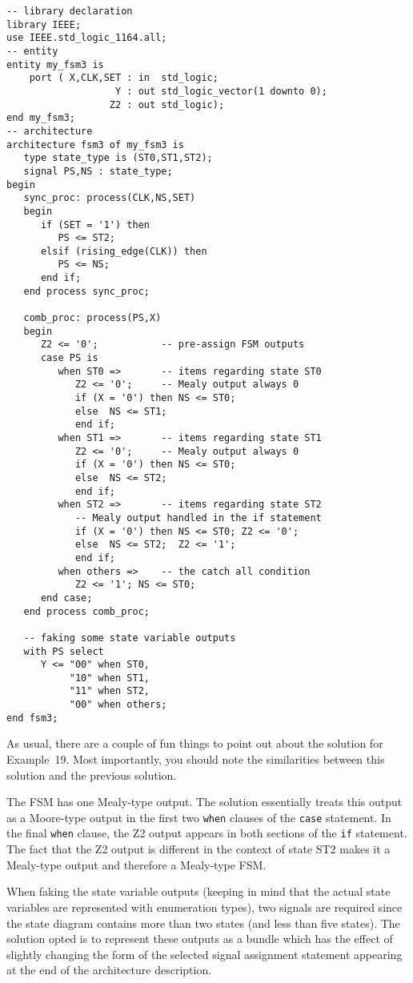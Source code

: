 \noindent
\begin{minipage}{0.99\linewidth}
\begin{lstlisting}[label=exe_19_code, caption=Solution to Example~19.]
-- library declaration
library IEEE;
use IEEE.std_logic_1164.all;
-- entity
entity my_fsm3 is
    port ( X,CLK,SET : in  std_logic;
                   Y : out std_logic_vector(1 downto 0);
                  Z2 : out std_logic);
end my_fsm3;
-- architecture
architecture fsm3 of my_fsm3 is
   type state_type is (ST0,ST1,ST2);
   signal PS,NS : state_type;
begin
   sync_proc: process(CLK,NS,SET)
   begin
      if (SET = '1') then
         PS <= ST2;
      elsif (rising_edge(CLK)) then
         PS <= NS;
      end if;
   end process sync_proc;

   comb_proc: process(PS,X)
   begin
      Z2 <= '0';           -- pre-assign FSM outputs
      case PS is
         when ST0 =>       -- items regarding state ST0
            Z2 <= '0';     -- Mealy output always 0
            if (X = '0') then NS <= ST0;
            else  NS <= ST1;
            end if;
         when ST1 =>       -- items regarding state ST1
            Z2 <= '0';     -- Mealy output always 0
            if (X = '0') then NS <= ST0;
            else  NS <= ST2;
            end if;
         when ST2 =>       -- items regarding state ST2
            -- Mealy output handled in the if statement
            if (X = '0') then NS <= ST0; Z2 <= '0';
            else  NS <= ST2;  Z2 <= '1';
            end if;
         when others =>    -- the catch all condition
            Z2 <= '1'; NS <= ST0;
      end case;
   end process comb_proc;

   -- faking some state variable outputs
   with PS select
      Y <= "00" when ST0,
           "10" when ST1,
           "11" when ST2,
           "00" when others;
end fsm3;
\end{lstlisting}
\end{minipage}

As usual, there are a couple of fun things to point out about the solution for Example~19. Most importantly, you should note the similarities between this solution and the previous solution.

\begin{my_list}
\item The FSM has one Mealy-type output. The solution essentially treats this output as a Moore-type output in the first two \texttt{when} clauses of the \texttt{case} statement. In the final \texttt{when} clause, the Z2 output appears in both sections of the \texttt{if} statement. The fact that the Z2 output is different in the context of state ST2 makes it a Mealy-type output and therefore a Mealy-type FSM.

\item When faking the state variable outputs (keeping in mind that the actual state variables are represented with enumeration types), two signals are required since the state diagram contains more than two states (and less than five states). The solution opted is to represent these outputs as a bundle which has the effect of slightly changing the form of the selected signal assignment statement appearing at the end of the architecture description.
\end{my_list}

